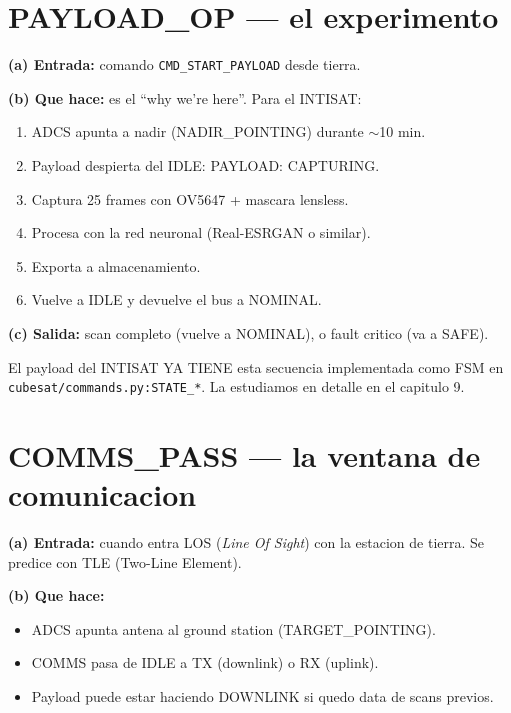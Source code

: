 \documentclass[11pt,a4paper,oneside,openright]{book}
\begin{document}
\section{PAYLOAD\_OP --- el experimento}

\textbf{(a) Entrada:} comando \texttt{CMD\_START\_PAYLOAD} desde
tierra.

\textbf{(b) Que hace:} es el ``why we're here''. Para el INTISAT:

\begin{enumerate}[leftmargin=2em]
  \item ADCS apunta a nadir (NADIR\_POINTING) durante $\sim$10 min.
  \item Payload despierta del IDLE: PAYLOAD: CAPTURING.
  \item Captura 25 frames con OV5647 + mascara lensless.
  \item Procesa con la red neuronal (Real-ESRGAN o similar).
  \item Exporta a almacenamiento.
  \item Vuelve a IDLE y devuelve el bus a NOMINAL.
\end{enumerate}

\textbf{(c) Salida:} scan completo (vuelve a NOMINAL), o fault
critico (va a SAFE).

\begin{logrado}
El payload del INTISAT YA TIENE esta secuencia implementada como FSM
en \texttt{cubesat/commands.py:STATE\_*}. La estudiamos en detalle
en el capitulo 9.
\end{logrado}

\section{COMMS\_PASS --- la ventana de comunicacion}

\textbf{(a) Entrada:} cuando entra LOS (\emph{Line Of Sight}) con la
estacion de tierra. Se predice con TLE (Two-Line Element).

\textbf{(b) Que hace:}

\begin{itemize}[leftmargin=2em]
  \item ADCS apunta antena al ground station (TARGET\_POINTING).
  \item COMMS pasa de IDLE a TX (downlink) o RX (uplink).
  \item Payload puede estar haciendo DOWNLINK si quedo data de scans
    previos.
\end{itemize}
\end{document}
